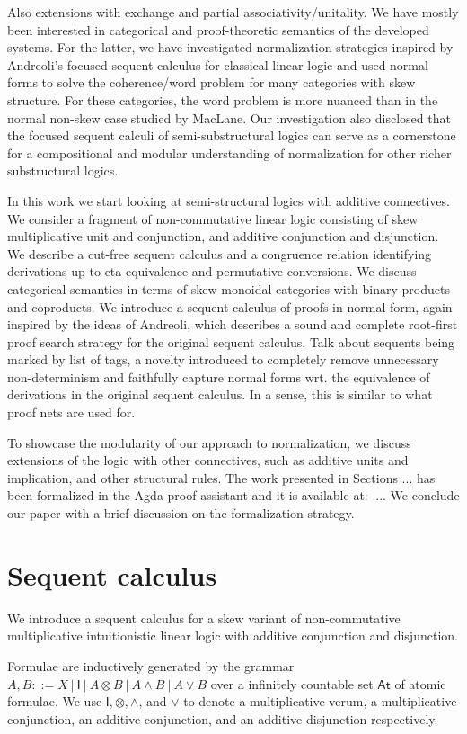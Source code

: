 \documentclass[submission,copyright,creativecommons]{eptcs}
\theoremstyle{definition}
\newcommand{\ot}{\otimes}
\newcommand{\I}{\mathsf{I}}
\begin{document}
Also extensions with exchange and partial associativity/unitality. We have mostly been interested in categorical  and proof-theoretic semantics of the developed systems. For the latter, we have investigated normalization strategies inspired by Andreoli's focused sequent calculus for classical linear logic and used normal forms to solve the coherence/word problem for many categories with skew structure. For these categories, the word problem is more nuanced than in the normal non-skew case studied by MacLane. Our investigation also disclosed that the focused sequent calculi of semi-substructural logics can serve as a cornerstone for a compositional and modular understanding of normalization for other richer substructural logics.

In this work we start looking at semi-structural logics with additive connectives. We consider a fragment of non-commutative linear logic consisting of skew multiplicative unit and conjunction, and additive conjunction and disjunction. We describe a cut-free sequent calculus and a congruence relation identifying derivations up-to eta-equivalence and permutative conversions. We discuss categorical semantics in terms of skew monoidal categories with binary products and coproducts. We introduce a sequent calculus of proofs in normal form, again inspired by the ideas of Andreoli, which describes a sound and complete root-first proof search strategy for the original sequent calculus. Talk about sequents being marked by list of tags, a novelty introduced to completely remove unnecessary non-determinism and faithfully capture normal forms wrt. the equivalence of derivations in the original sequent calculus. In a sense, this is similar to what proof nets are used for.

To showcase the modularity of our approach to normalization, we discuss extensions of the logic with other connectives, such as additive units and implication, and other structural rules. The work presented in Sections ... has been formalized in the Agda proof assistant and it is available at: .... We conclude our paper with a brief discussion on the formalization strategy.

\section{Sequent calculus}
We introduce a sequent calculus for a skew variant of non-commutative multiplicative intuitionistic linear logic with additive conjunction and disjunction.

Formulae are inductively generated by the grammar $A,B ::= X \ | \ \I \ | \ A \ot B \ | \ A \land B \ | \ A \lor B$ over a infinitely countable set $\mathsf{At}$ of atomic formulae. 
We use $\I , \ot , \land$, and $\lor$ to denote a multiplicative verum, a multiplicative conjunction, an additive conjunction, and an additive disjunction respectively.
\end{document}
